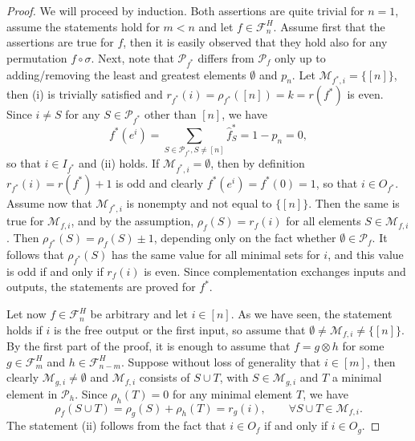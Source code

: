 \documentclass[12pt]{article}
\theoremstyle{definition}
\theoremstyle{remark}
\def\Pe{\mathcal P}
\def\Me{\mathcal M}
\def\Fe{\mathcal F}
\begin{document}
\begin{proof}  We will proceed by induction. Both  assertions are quite trivial for $n=1$,
assume the statements hold for $m<n$ and let $f\in \Fe_n^H$. Assume first that the assertions are
true for $f$, then it is easily observed that they hold also for any permutation $f\circ
\sigma$.
Next, note that $\Pe_{f^*}$ differs from $\Pe_f$ only up to adding/removing the least and greatest elements $\emptyset$ and
$p_n$. Let $\Me_{f^*,i}=\{[n]\}$, then (i) is trivially satisfied and
$r_{f^*}(i)=\rho_{f^*}([n])=k=r(f^*)$ is even. Since $i\ne S$ for any $S\in \Pe_{f^*}$
other than $[n]$, we have
\[
f^*(e^i)=\sum_{S\in \Pe_{f^*}, S\ne [n]} \hat f^*_S=1-p_n=0,
\]
so that $i\in I_{f^*}$ and (ii) holds. If $\Me_{f^*,i}=\emptyset$, then by definition
$r_{f^*}(i)=r(f^*)+1$ is odd and clearly $f^*(e^i)=f^*(0)=1$, so that $i\in O_{f^*}$. 
Assume now that $\Me_{f^*,i}$ is nonempty and not equal to $\{[n]\}$. Then the same is
true for $\Me_{f,i}$, and by the assumption, $\rho_{f}(S)=r_f(i)$ for all elements  $S\in
\Me_{f,i}$. Then $\rho_{f^*}(S)=\rho_f(S)\pm 1$, depending only on the fact whether $\emptyset
\in \Pe_f$. It follows that $\rho_{f^*}(S)$ has the same value for all minimal sets for
$i$, and this value is odd if and only if $r_f(i)$ is even. Since complementation
exchanges inputs and outputs, the statements are proved for $f^*$.

Let now $f\in \Fe_n^H$ be arbitrary and let $i\in [n]$. As we have seen, the statement
holds if $i$ is the free output or the first input, so assume that $\emptyset\ne
\Me_{f,i}\ne \{[n]\}$. By the first part of the proof, it is enough to assume that
$f=g\otimes h$ for some $g\in \Fe_m^H$ and $h\in \Fe_{n-m}^H$. 
Suppose without loss of generality that $i\in [m]$, then clearly $\Me_{g,i}\ne \emptyset$
and $\Me_{f,i}$ consists of $S\cup T$, with $S\in \Me_{g,i}$ and $T$ a minimal element in
$\Pe_h$. Since $\rho_h(T)=0$ for any minimal element $T$, we have
\[
\rho_f(S\cup T)=\rho_g(S)+\rho_h(T)=r_g(i),\qquad \forall S\cup T \in \Me_{f,i}.
\]
The statement (ii) follows from the fact that $i\in O_f$ if and only if $i\in O_g$. 




\end{proof}
\end{document}
